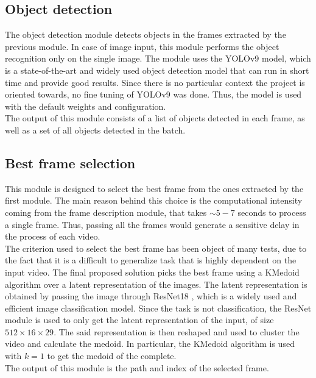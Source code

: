 \documentclass[conference]{IEEEtran}
\begin{document}
\subsection{Object detection}
The object detection module detects objects in the frames extracted by the previous module. In case of image input, this module performs the object recognition only on the single image. 
The module uses the YOLOv9 \cite{yolo} model, which is a state-of-the-art and widely used object detection model that can run in short time and provide good results.
Since there is no particular context the project is oriented towards, no fine tuning of YOLOv9 was done. Thus, the model is used with the default weights and configuration. \\
The output of this module consists of a list of objects detected in each frame, as well as a set of all objects detected in the batch.

\subsection{Best frame selection}
This module is designed to select the best frame from the ones extracted by the first module. The main reason behind this choice is the computational intensity coming from the frame description module,
that takes $\sim 5-7$ seconds to process a single frame. Thus, passing all the frames would generate a sensitive delay in the process of each video. \\ 
The criterion used to select the best frame has been object of many tests, due to the fact that it is a difficult to generalize task that is highly dependent on the input video. 
The final proposed solution picks the best frame using a KMedoid algorithm over a latent representation of the images. The latent representation is obtained by passing the image through ResNet18 \cite{resnet}, which is a widely used and efficient image classification model. Since the task is not classification, the ResNet module is used to only get the latent representation of the input, of size $512 \times 16 \times 29 $. The said representation is then reshaped and used to cluster the video and calculate the medoid. In particular, the KMedoid algorithm is used with $k=1$ to get the medoid of the complete. \\
The output of this module is the path and index of the selected frame.  
\end{document}
